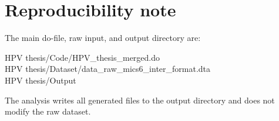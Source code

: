 \section{Reproducibility note}

The main do-file, raw input, and output directory are:

\begin{flushleft}
\small\ttfamily
HPV thesis/Code/HPV\_thesis\_merged.do\\
HPV thesis/Dataset/data\_raw\_mics6\_inter\_format.dta\\
HPV thesis/Output
\end{flushleft}

The analysis writes all generated files to the output directory and does not modify the raw dataset.

\clearpage
